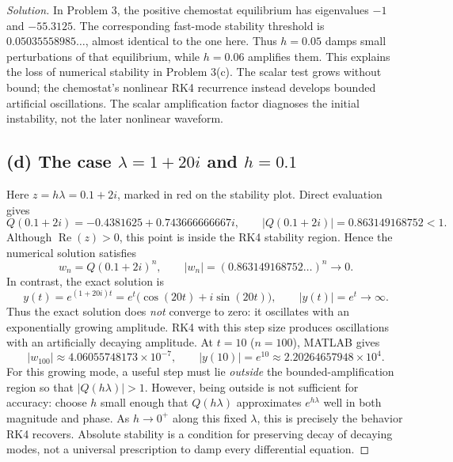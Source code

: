 \documentclass[12pt]{amsart}
\newenvironment{solution}
{\begin{proof}[Solution]}
{\end{proof}}
\begin{document}
\begin{onehalfspace}
\begin{solution}
            In Problem 3, the positive chemostat equilibrium has eigenvalues $-1$
            and $-55.3125$. The corresponding fast-mode stability threshold is
            $0.05035558985\ldots$, almost identical to the one here. Thus $h=0.05$
            damps small perturbations of that equilibrium, while $h=0.06$ amplifies
            them. This explains the loss of numerical stability in Problem 3(c).
            The scalar test grows without bound; the chemostat's nonlinear RK4
            recurrence instead develops bounded artificial oscillations. The scalar
            amplification factor diagnoses the initial instability, not the later
            nonlinear waveform.

            \subsection*{(d) The case $\lambda=1+20i$ and $h=0.1$}
            Here $z=h\lambda=0.1+2i$, marked in red on the stability plot.
            Direct evaluation gives
            \[
                Q(0.1+2i)=-0.4381625+0.743666666667i,
                \qquad |Q(0.1+2i)|=0.863149168752<1.
            \]
            Although $\operatorname{Re}(z)>0$, this point is inside the RK4
            stability region. Hence the numerical solution satisfies
            \[
                w_n=Q(0.1+2i)^n,\qquad
                |w_n|=(0.863149168752\ldots)^n\longrightarrow0.
            \]
            In contrast, the exact solution is
            \[
                y(t)=e^{(1+20i)t}=e^t\bigl(\cos(20t)+i\sin(20t)\bigr),
                \qquad |y(t)|=e^t\longrightarrow\infty.
            \]
            Thus the exact solution does \emph{not} converge to zero: it oscillates
            with an exponentially growing amplitude. RK4 with this step size
            produces oscillations with an artificially decaying amplitude.
            At $t=10$ ($n=100$), MATLAB gives
            \[
                \boxed{|w_{100}|\approx4.06055748173\times10^{-7},
                    \qquad |y(10)|=e^{10}\approx2.20264657948\times10^4.}
            \]
            For this growing mode, a useful step must lie \emph{outside} the
            bounded-amplification region so that $|Q(h\lambda)|>1$. However,
            being outside is not sufficient for accuracy: choose $h$ small enough
            that $Q(h\lambda)$ approximates $e^{h\lambda}$ well in both magnitude
            and phase. As $h\to0^+$ along this fixed $\lambda$, this is precisely
            the behavior RK4 recovers. Absolute stability is a condition for
            preserving decay of decaying modes, not a universal prescription
            to damp every differential equation.


\end{solution}
\end{onehalfspace}
\end{document}

